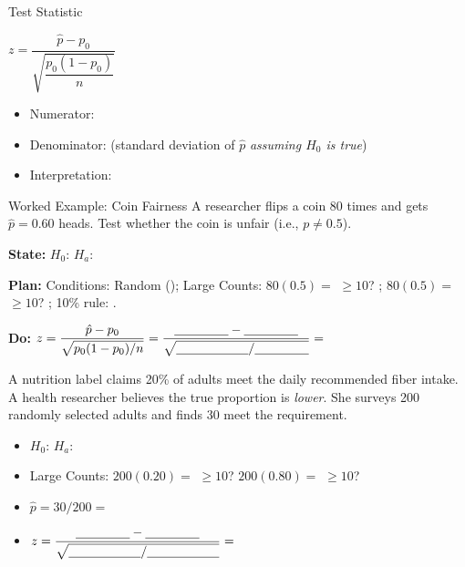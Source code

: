 \documentclass[10pt]{article}
\begin{document}
\begin{notesbox}{Test Statistic}
\begin{center}
$z = \dfrac{\hat p - p_0}{\sqrt{\dfrac{p_0(1-p_0)}{n}}}$
\end{center}

\begin{itemize}
  \item Numerator: \blank{7cm}
  \item Denominator: \blank{7cm} (standard deviation of $\hat p$ \emph{assuming $H_0$ is true})
  \item Interpretation: \blank{8cm}
\end{itemize}
\end{notesbox}

\begin{notesbox}{Worked Example: Coin Fairness}
A researcher flips a coin 80 times and gets $\hat p = 0.60$ heads. Test whether the coin is
unfair (i.e., $p \ne 0.5$).

\textbf{State:} $H_0$: \blank{3cm} \quad $H_a$: \blank{3cm}

\textbf{Plan:} Conditions: Random (\blank{3cm}); Large Counts: $80(0.5) = $ \blank{1.5cm} $\ge 10$? \blank{1cm};
$80(0.5) = $ \blank{1.5cm} $\ge 10$? \blank{1cm}; 10\% rule: \blank{2cm}.

\textbf{Do:} $z = \dfrac{\hat p - p_0}{\sqrt{p_0(1-p_0)/n}} = \dfrac{\blank{1.5cm} - \blank{1.5cm}}{\sqrt{\blank{2cm}/\blank{1.5cm}}} = $ \blank{2cm}
\end{notesbox}

\begin{practicebox}
A nutrition label claims 20\% of adults meet the daily recommended fiber intake. A health
researcher believes the true proportion is \emph{lower}. She surveys 200 randomly selected
adults and finds 30 meet the requirement.

\begin{itemize}
  \item $H_0$: \blank{4cm} \quad $H_a$: \blank{4cm}
  \item Large Counts: $200(0.20) = $ \blank{2cm} $\ge 10$? \blank{1cm} \quad $200(0.80) = $ \blank{2cm} $\ge 10$? \blank{1cm}
  \item $\hat p = 30/200 = $ \blank{1.5cm}
  \item $z = \dfrac{\blank{1.5cm} - \blank{1.5cm}}{\sqrt{\blank{2cm}/\blank{2cm}}} = $ \blank{2cm}
\end{itemize}
\end{practicebox}
\end{document}
